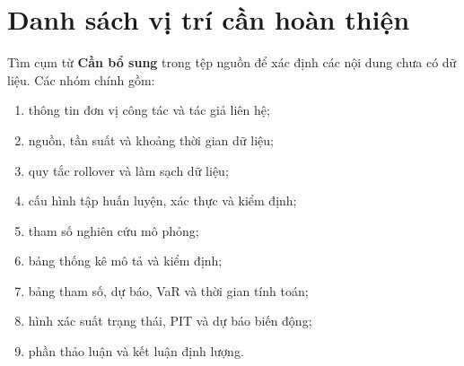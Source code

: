\documentclass[12pt,a4paper]{article}
\numberwithin{equation}{section}
\begin{document}
\section{Danh sách vị trí cần hoàn thiện}\label{app:placeholders}

Tìm cụm từ \textcolor{PlaceholderRed}{\textbf{Cần bổ sung}} trong tệp nguồn để xác định các nội dung chưa có dữ liệu. Các nhóm chính gồm:
\begin{enumerate}
  \item thông tin đơn vị công tác và tác giả liên hệ;
  \item nguồn, tần suất và khoảng thời gian dữ liệu;
  \item quy tắc rollover và làm sạch dữ liệu;
  \item cấu hình tập huấn luyện, xác thực và kiểm định;
  \item tham số nghiên cứu mô phỏng;
  \item bảng thống kê mô tả và kiểm định;
  \item bảng tham số, dự báo, VaR và thời gian tính toán;
  \item hình xác suất trạng thái, PIT và dự báo biến động;
  \item phần thảo luận và kết luận định lượng.
\end{enumerate}
\end{document}
